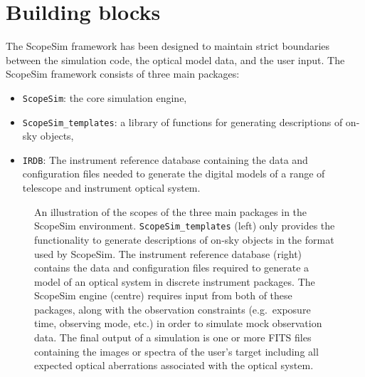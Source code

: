 

\section{Building blocks}
\label{building-blocks}

The ScopeSim framework has been designed to maintain strict boundaries between the simulation code, the optical model data, and the user input.
The ScopeSim framework consists of three main packages:
\begin{itemize}
\item \lstinline{ScopeSim}: the core simulation engine,

\item \lstinline{ScopeSim_templates}: a library of functions for generating descriptions of on-sky objects,

\item \lstinline{IRDB}: The instrument reference database containing the data and configuration files needed to generate the digital models of a range of telescope and instrument optical system.
\end{itemize}

\begin{figure}

\caption{An illustration of the scopes of the three main packages in the ScopeSim environment.
\lstinline{ScopeSim_templates} (left) only provides the functionality to generate descriptions of on-sky objects in the format used by ScopeSim.
The instrument reference database (right) contains the data and configuration files required to generate a model of an optical system in discrete instrument packages.
The ScopeSim engine (centre) requires input from both of these packages, along with the observation constraints (e.g.~exposure time, observing mode, etc.) in order to simulate mock observation data.
The final output of a simulation is one or more FITS files containing the images or spectra of the user's  target including all expected optical aberrations associated with the optical system.}
\label{fig:framework}

\end{figure}

